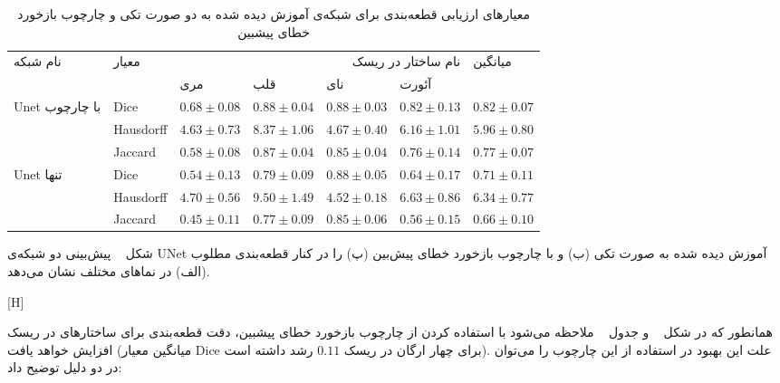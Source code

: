 \begin{table}[H]
	\caption{معیارهای ارزیابی قطعه‌بندی برای شبکه‌ی آموزش دیده شده به دو صورت تکی و چارچوب بازخورد خطای پیشبین}
	\label{peptableresults}
	\begin{tabular}{lllllll}
		\hline
		\multirow{2}{*}{نام شبکه}      & \multirow{2}{*}{معیار} & \multicolumn{4}{r}{نام ساختار در ریسک}                & \multirow{2}{*}{میانگین} \\ \cline{3-6}
		&                        & مری   & قلب       & نای     & آئورت       &                          \\ \hline
		\multirow{3}{*}{Unet با چارچوب}          & Dice                    & $0.68 \pm 0.08$  & $0.88\pm0.04$   & $0.88\pm0.03$   & $0.82\pm0.13$   & $0.82\pm0.07$                \\ \cline{2-7} 
		& Hausdorff                   & $4.63\pm0.73$   & $8.37\pm1.06$   & $4.67\pm0.40$   & $6.16\pm1.01$   & $5.96\pm0.80$                \\ \cline{2-7} 
		& Jaccard                  & $0.58\pm0.08$   & $0.87\pm0.04$   & $0.85\pm0.04$   & $0.76\pm0.14$   & $0.77\pm0.07$                \\ \hline
		\multirow{3}{*}{Unet تنها} & Dice                   & $0.54 \pm 0.13$ & $0.79 \pm 0.09$ & $0.88 \pm 0.05$ & $0.64 \pm 0.17$ & $0.71\pm0.11$                \\ \cline{2-7} 
		& Hausdorff                  & $4.70 \pm 0.56$ & $9.50 \pm 1.49$ & $4.52 \pm 0.18$ & $6.63 \pm 0.86$ & $6.34\pm0.77$                \\ \cline{2-7} 
		& Jaccard                  & $0.45 \pm 0.11$ & $0.77 \pm 0.09$ & $0.85 \pm 0.06$ & $0.56 \pm 0.15$ & $0.66\pm0.10$                \\ \hline
	\end{tabular}
\end{table}

شکل ~ پیش‌بینی دو شبکه‌ی UNet آموزش دیده شده به صورت تکی (ب) و با چارچوب بازخورد خطای پیش‌بین (پ) را در کنار قطعه‌بندی مطلوب (الف) در نماهای مختلف نشان می‌دهد. 

[H]

همانطور که در شکل ~ و جدول ~ ملاحظه‌ می‌شود با استفاده کردن از چارچوب بازخورد خطای پیشبین، دقت قطعه‌بندی برای ساختارهای در ریسک افزایش خواهد یافت (میانگین معیار Dice برای چهار ارگان در ریسک $0.11$ رشد داشته است). علت این بهبود در استفاده از این چارچوب را می‌توان در دو دلیل توضیح داد:

